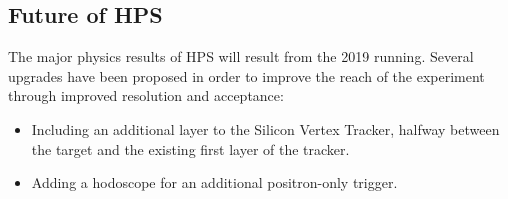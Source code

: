 \documentclass[b1]{sciposter}
\begin{document}
\begin{multicols}{3}
        \section*{Future of HPS}
%

        The major physics results of HPS will result from the 2019 running. %
        Several upgrades have been proposed in order to improve the reach of the experiment through improved resolution and acceptance:  
     	\begin{itemize}
	\item Including an additional layer to the Silicon Vertex Tracker, halfway between the target and the existing first layer of the tracker.  
	\item Adding a hodoscope for an additional positron-only trigger.  
	\end{itemize}
	
\end{multicols}
\end{document}
